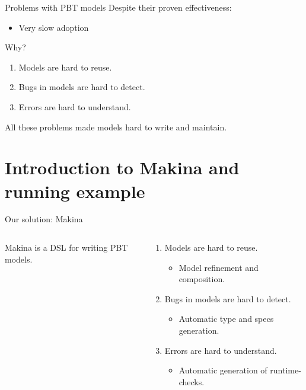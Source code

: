 \documentclass[aspectratio=169, 10pt, handout]{beamer}
\begin{document}
\begin{frame}[label={sec:orgdf5c6fd}]{Problems with PBT models}
Despite their proven effectiveness:
\begin{itemize}
\item Very slow adoption
\end{itemize}

\vspace{10pt}

Why?

\vspace{10pt}

\begin{enumerate}
\item Models are hard to reuse.
\item Bugs in models are hard to detect.
\item Errors are hard to understand.
\end{enumerate}

\vspace{10pt}

All these problems made models hard to write and maintain.
\end{frame}

\section{Introduction to Makina and running example}
\label{sec:orgf41d92e}
\begin{frame}[label={sec:orga66aa88}]{Our solution: Makina}
\begin{columns}
\begin{column}{0.48\columnwidth}
Makina is a DSL for writing PBT models.

\vspace{10pt}
\end{column}

\begin{column}{0.48\columnwidth}
\begin{enumerate}
\item Models are hard to reuse.
\begin{itemize}
\item Model refinement and composition. \vspace{10pt}
\end{itemize}
\item Bugs in models are hard to detect.
\begin{itemize}
\item Automatic type and specs generation. \vspace{10pt}
\end{itemize}
\item Errors are hard to understand.
\begin{itemize}
\item Automatic generation of runtime-checks. \vspace{10pt}
\end{itemize}
\end{enumerate}
\end{column}
\end{columns}
\end{frame}
\end{document}
